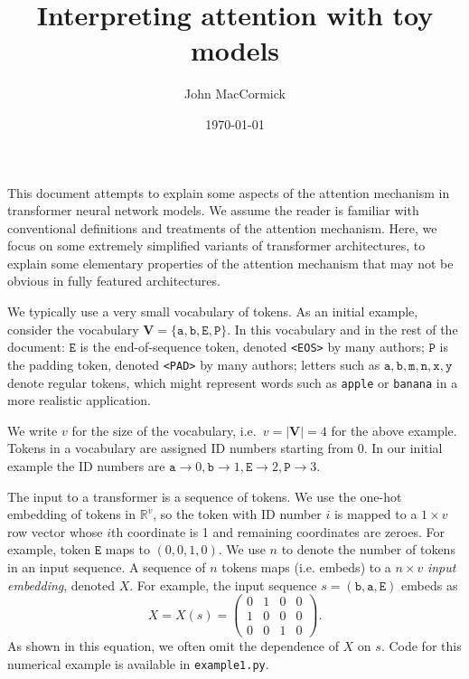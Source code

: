\documentclass{article}
\title{Interpreting attention with toy models}
\author{John MacCormick}
\date{\today}
\newcommand{\ta}{\mathtt{a}}
\newcommand{\tb}{\mathtt{b}}
\newcommand{\tn}{\mathtt{n}}
\newcommand{\tm}{\mathtt{m}}
\newcommand{\tx}{\mathtt{x}}
\newcommand{\ty}{\mathtt{y}}
\newcommand{\tE}{\mathtt{E}}
\newcommand{\tP}{\mathtt{P}}
\newcommand{\bV}{\mathbf{V}}
\newcommand{\sR}{\mathbb{R}}
\newcommand{\by}{\times}
\begin{document}
\maketitle

This document attempts to explain some aspects of the attention
mechanism in transformer neural network models. We assume the reader
is familiar with conventional definitions and treatments of the
attention mechanism. Here, we focus on some extremely simplified
variants of transformer architectures, to explain some elementary
properties of the attention mechanism that may not be obvious in fully
featured architectures.

We typically use a very small vocabulary of tokens. As an initial
example, consider the vocabulary $\bV=\{\ta, \tb, \tE, \tP\}$. In this
vocabulary and in the rest of the document: $\tE$ is the
end-of-sequence token, denoted \texttt{<EOS>} by many authors; $\tP$
is the padding token, denoted \texttt{<PAD>} by many authors; letters
such as $\ta, \tb, \tm, \tn, \tx, \ty$ denote regular tokens, which
might represent words such as \texttt{apple} or \texttt{banana} in a
more realistic application.

We write $v$ for the size of the vocabulary, i.e.\ $v=|\bV|=4$ for the
above example. Tokens in a vocabulary are assigned ID numbers starting
from 0. In our initial example the ID numbers are
$\ta\to 0, \tb\to 1, \tE\to 2, \tP\to 3.$

The input to a transformer is a sequence of tokens. We use the one-hot
embedding of tokens in $\sR^v$, so the token with ID number $i$ is
mapped to a $1 \by v$ row vector whose $i$th coordinate is 1 and
remaining coordinates are zeroes. For example, token $\tE$ maps to
$(0,0,1,0)$. We use $n$ to denote the number of tokens in an input
sequence. A sequence of $n$ tokens maps (i.e. embeds) to a
$n \by v$ \emph{input embedding}, denoted $X$. For example, the input
sequence $s = (\tb, \ta, \tE)$ embeds as
\begin{displaymath}
  X = X(s)=
\begin{pmatrix}
0 & 1 & 0 & 0 \\
1 & 0 & 0 & 0 \\
0 & 0 & 1 & 0 
\end{pmatrix}.
\end{displaymath}
As shown in this equation, we often omit the dependence of $X$ on
$s$. Code for this numerical example is available in
\texttt{example1.py}.
\end{document}
